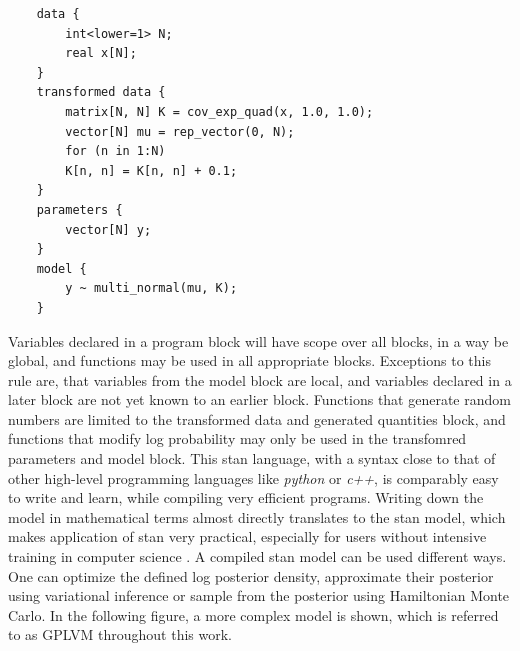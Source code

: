 \lstset{basicstyle=\tiny, style=Stan}
\begin{lstlisting}
	data {
		int<lower=1> N;
		real x[N];
	}
	transformed data {
		matrix[N, N] K = cov_exp_quad(x, 1.0, 1.0);
		vector[N] mu = rep_vector(0, N);
		for (n in 1:N)
		K[n, n] = K[n, n] + 0.1;
	}
	parameters {
		vector[N] y;
	}
	model {
		y ~ multi_normal(mu, K);
	}
\end{lstlisting}
Variables declared in a program block will have scope over all blocks, in a way be global, and functions may be used in all appropriate blocks. Exceptions to this rule are, that variables from the model block are local, and variables declared in a later block are not yet known to an earlier block. Functions that generate random numbers are limited to the transformed data and generated quantities block, and functions that modify log probability may only be used in the transfomred parameters and model block. This stan language, with a syntax close to that of other high-level programming languages like \textit{python} or \textit{c++}, is comparably easy to write and learn, while compiling very efficient programs. Writing down the model in mathematical terms almost directly translates to the stan model, which makes application of stan very practical, especially for users without intensive training in computer science \cite{stan_manual}. A compiled stan model can be used different ways. One can optimize the defined log posterior density, approximate their posterior using variational inference or sample from the posterior using Hamiltonian Monte Carlo. In the following figure, a more complex model is shown, which is referred to as GPLVM throughout this work.
\lstset{basicstyle=\tiny, style=Stan}
